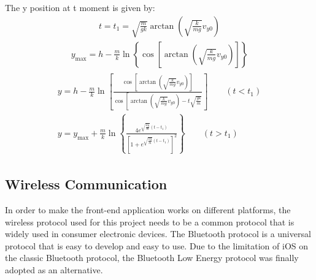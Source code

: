 The y position at t moment is given by:
\begin{align}
    t=t_{1}=\sqrt{\frac{m}{g k}} \arctan \left(\sqrt{\frac{k}{m g}} v_{y 0}\right)
\end{align}
\begin{align}
    y_{\max }=h-\frac{m}{k} \ln \left\{\cos \left[\arctan \left(\sqrt{\frac{k}{m g}} v_{y 0}\right)\right]\right\}
\end{align}
\begin{align}
\begin{split}
   y=h-\frac{m}{k} \ln \left[\frac{\cos \left[\arctan \left(\sqrt{\frac{k}{m g}} v_{y 0}\right)\right]}{\cos \left[\arctan \left(\sqrt{\frac{k}{m g}} v_{y 0}\right)-t \sqrt{\frac{g k}{m}}\right.}\right] \qquad(t<t_1)\\
    y=y_{\max }+\frac{m}{k} \ln \left\{\frac{4 e^{\sqrt{\frac{k g}{m}}\left(t-t_{1}\right)}}{\left[1+e^{\sqrt{\frac{k g}{m}}\left(t-t_{1}\right)}\right]^{2}}\right\}\qquad(t>t_1)
\end{split}
\end{align}

\subsection{Wireless Communication}
In order to make the front-end application works on different platforms, the wireless protocol used for this project needs to be a common protocol that is widely used in consumer electronic devices. The Bluetooth protocol is a universal protocol that is easy to develop and easy to use. Due to the limitation of iOS on the classic Bluetooth protocol, the Bluetooth Low Energy protocol was finally adopted as an alternative.


